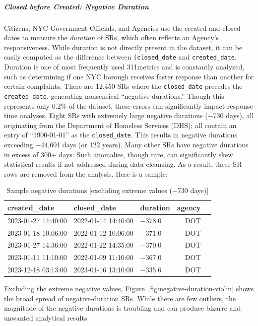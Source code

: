 \documentclass[linenumber]{jdsart}
\begin{document}
\subparagraph{Closed before Created: Negative Duration}
Citizens, NYC Government Officials, and Agencies use the created and 
closed dates to measure the \textit{duration} of SRs, which often reflects an Agency's 
responsiveness. While duration is not directly present in the dataset, 
it can be easily computed as the difference between
\texttt{(closed\_date} and \texttt{created\_date}.  Duration is one of 
most frequently used 311metrics and is constantly analyzed, such as determining if 
one NYC borough receives faster response than another for certain 
complaints. There are 12,450 SRs where the \texttt{closed\_date} precedes the 
\texttt{created\_date}, generating nonsensical ``negative durations.'' 
Though this represents only 0.2\% of the dataset, these errors can 
significantly impact response time analyses. Eight SRs with extremely 
large negative durations ($-$730 days), all originating from the 
Department of Homeless Services (DHS); all contain an entry 
of ``1900-01-01'' as the \texttt{closed\_date}. This results 
in negative durations exceeding $-$44,601 days (or 122 years). Many
other SRs have negative durations in excess of 300+ days. Such 
anomalies, though rare, can significantly skew statistical results if 
not addressed during data cleansing. As a result, these SR rows are 
removed from the analysis. Here is a sample:

\begin{table}[tbp]
  \centering
  \caption{Sample  negative durations [excluding extreme  values ($-$730 days)]}
  \begin{tabular}{l l l r l}
    \toprule
    {created\_date} & {closed\_date} & {duration} 
    & \textbf{agency} \\
    \midrule
    2023-01-27 14:40:00 & 2022-01-14 14:40:00 & $-$378.0 & DOT \\
    2023-01-18 10:06:00 & 2022-01-12 10:06:00 & $-$371.0 & DOT \\
    2023-01-27 14:36:00 & 2022-01-22 14:35:00 & $-$370.0 & DOT \\
    2023-01-11 11:10:00 & 2022-01-09 11:10:00 & $-$367.0 & DOT \\
    2023-12-18 03:13:00 & 2023-01-16 13:10:00 & $-$335.6 & DOT \\
    \bottomrule
  \end{tabular}
  \label{tab:largest-errors}
\end{table}

Excluding the extreme negative values, 
Figure~\ref{fig:negative-duration-violin} shows the broad spread of 
negative-duration SRs. While there are few outliers, the magnitude 
of the negative durations is troubling and can produce bizarre
and unwanted analytical results.
\end{document}
